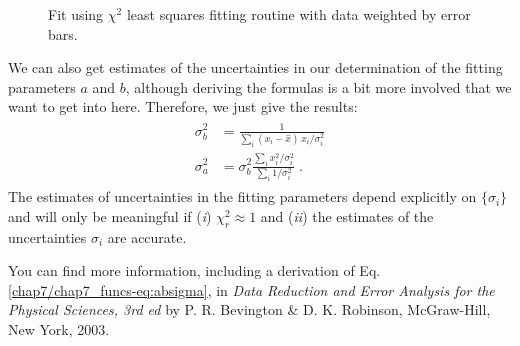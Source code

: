 \documentclass[letterpaper,10pt,english]{sphinxmanual}
\begin{document}
\begin{figure}[htbp]
\centering
\capstart

\caption{Fit using $\chi^2$ least squares fitting routine with data weighted by error bars.}\label{chap7/chap7_funcs:fig-linregerrbars}\end{figure}

We can also get estimates of the uncertainties in our determination of the fitting parameters $a$ and $b$, although deriving the formulas is a bit more involved that we want to get into here.  Therefore, we just give the results:
\label{chap7/chap7_funcs:equation-eq:absigma}\begin{gather}
\begin{split}\sigma_{b}^2 &= \frac{1} {\sum_{i}(x_{i} - \hat{x})\,x_{i}/\sigma_{i}^2}\\
\sigma_{a}^2 &= \sigma_{b}^2 \frac{\sum_{i}x_{i}^2/\sigma_{i}^2} {\sum_{i}1/\sigma_{i}^2}\;.\end{split}\label{chap7/chap7_funcs-eq:absigma}
\end{gather}
The estimates of uncertainties in the fitting parameters depend explicitly on $\{\sigma_{i}\}$ and will only be meaningful if (\emph{i}) $\chi_{r}^2 \approx 1$ and (\emph{ii}) the estimates of the uncertainties $\sigma_{i}$ are accurate.

You can find more information, including a derivation of Eq. \eqref{chap7/chap7_funcs-eq:absigma}, in \emph{Data Reduction and Error Analysis for the Physical Sciences, 3rd ed} by P. R. Bevington \& D. K. Robinson, McGraw-Hill, New York, 2003.
\end{document}
